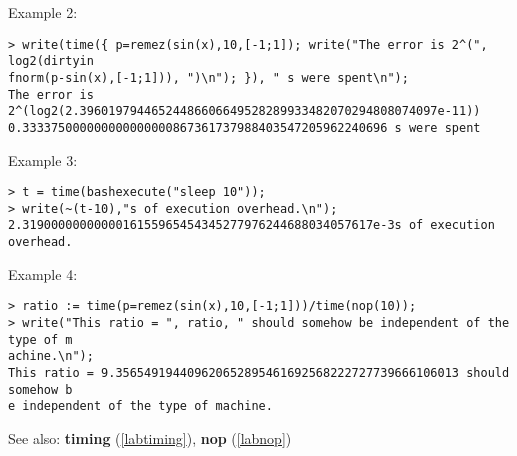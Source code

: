 \noindent Example 2: 
\begin{center}\begin{minipage}{15cm}\begin{Verbatim}[frame=single]
> write(time({ p=remez(sin(x),10,[-1;1]); write("The error is 2^(", log2(dirtyin
fnorm(p-sin(x),[-1;1])), ")\n"); }), " s were spent\n");
The error is 2^(log2(2.39601979446524486606649528289933482070294808074097e-11))
0.333375000000000000000867361737988403547205962240696 s were spent
\end{Verbatim}
\end{minipage}\end{center}
\noindent Example 3: 
\begin{center}\begin{minipage}{15cm}\begin{Verbatim}[frame=single]
> t = time(bashexecute("sleep 10"));
> write(~(t-10),"s of execution overhead.\n");
2.3190000000000016155965454345277976244688034057617e-3s of execution overhead.
\end{Verbatim}
\end{minipage}\end{center}
\noindent Example 4: 
\begin{center}\begin{minipage}{15cm}\begin{Verbatim}[frame=single]
> ratio := time(p=remez(sin(x),10,[-1;1]))/time(nop(10));
> write("This ratio = ", ratio, " should somehow be independent of the type of m
achine.\n");
This ratio = 9.356549194409620652895461692568222727739666106013 should somehow b
e independent of the type of machine.
\end{Verbatim}
\end{minipage}\end{center}
See also: \textbf{timing} (\ref{labtiming}), \textbf{nop} (\ref{labnop})
